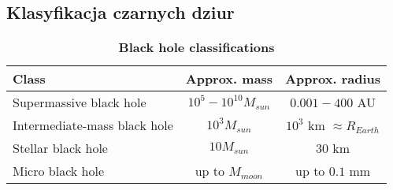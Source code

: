 \documentclass[12pt]{article}
\begin{document}
\subsection{Klasyfikacja czarnych dziur}

\begin{table}[h]
\caption{\textbf{Black hole classifications}}
\begin{center}
\renewcommand{\arraystretch}{2}
\begin{tabular}{|l|c|c|}
\hline
\textbf{Class} & \textbf{Approx. mass} & \textbf{Approx. radius} \\
\hline
Supermassive black hole & $10^5-10^{10} M_{sun}$ & $0.001-400$ AU \\
\hline
Intermediate-mass black hole & $10^3 M_{sun}$ & $10^3$ km $\approx R_{Earth}$  \\
\hline
Stellar black hole & $10 M_{sun}$ & $30$ km \\
\hline
Micro black hole & up to $M_{moon}$ & up to $0.1$ mm \\
\hline
\end{tabular}
\end{center}
\end{table}
\newpage
 
\end{document}
